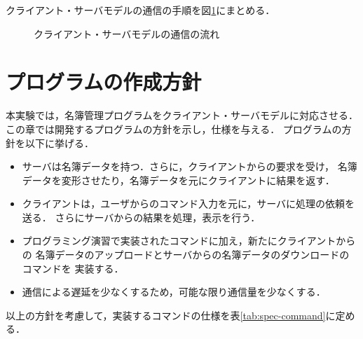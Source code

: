\documentclass[a4j,10pt]{jarticle}
\begin{document}
クライアント・サーバモデルの通信の手順を図\ref{fig:client-server}にまとめる．
\begin{figure}
  \centering
  
  \caption{クライアント・サーバモデルの通信の流れ}
  \label{fig:client-server}
\end{figure}

\section{プログラムの作成方針}
\label{sec:policy}
本実験では，名簿管理プログラムをクライアント・サーバモデルに対応させる．
この章では開発するプログラムの方針を示し，仕様を与える．
プログラムの方針を以下に挙げる．
\begin{itemize}
\item サーバは名簿データを持つ．さらに，クライアントからの要求を受け，
  名簿データを変形させたり，名簿データを元にクライアントに結果を返す．
\item クライアントは，ユーザからのコマンド入力を元に，サーバに処理の依頼を送る．
  さらにサーバからの結果を処理，表示を行う．
\item プログラミング演習で実装されたコマンドに加え，新たにクライアントからの
  名簿データのアップロードとサーバからの名簿データのダウンロードのコマンドを
  実装する．
\item 通信による遅延を少なくするため，可能な限り通信量を少なくする．
\end{itemize}
以上の方針を考慮して，実装するコマンドの仕様を表\ref{tab:spec-command}に定める．
\end{document}
